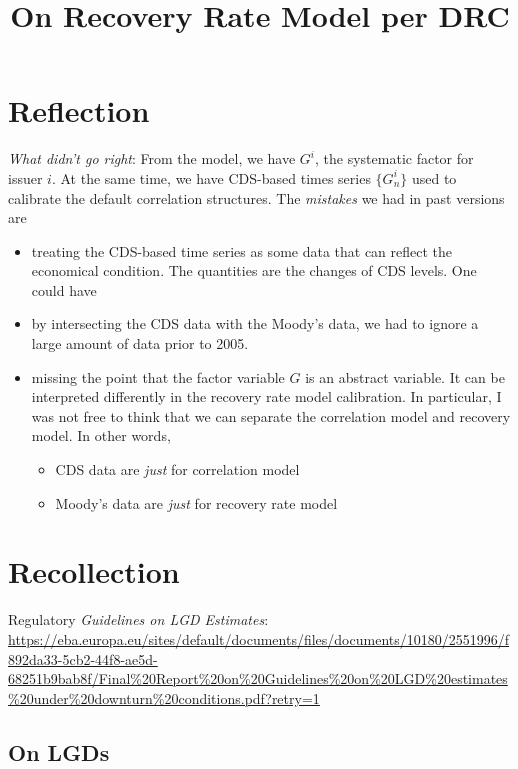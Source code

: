 \documentclass[12pt]{article}
\begin{document}
\title{On Recovery Rate Model per DRC}

\section{Reflection}


{\em What didn't go right}: From the model, we have $G^i$, the systematic factor for issuer $i$. At the same time, we have CDS-based times series $\{G^i_n\}$ used to calibrate the default correlation structures. The {\em mistakes} we had in past versions are
\begin{itemize}
    \item treating the CDS-based time series as some data that can reflect the economical condition. The quantities are the changes of CDS levels. One could have 
    \item by intersecting the CDS data with the Moody's data, we had to ignore a large amount of data prior to 2005.  
    \item missing the point that the factor variable $G$ is an abstract variable. It can be interpreted differently in the recovery rate model calibration. In particular, I was not free to think that we can separate the correlation model and recovery model. In other words, 
    \begin{itemize}
        \item CDS data are {\em just} for correlation model
        \item Moody's data are {\em just} for recovery rate model
    \end{itemize}
\end{itemize}


\section{Recollection}


Regulatory {\em Guidelines on LGD Estimates}: 
\url{https://eba.europa.eu/sites/default/documents/files/documents/10180/2551996/f892da33-5cb2-44f8-ae5d-68251b9bab8f/Final%20Report%20on%20Guidelines%20on%20LGD%20estimates%20under%20downturn%20conditions.pdf?retry=1}

\subsection{On LGDs}
\end{document}
